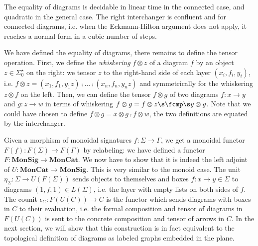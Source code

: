 \begin{theorem}
The equality of diagrams is decidable in linear time in the connected case, and quadratic in the general case.
The right interchanger is confluent and for connected diagrams, i.e. when the Eckmann-Hilton argument does not apply, it reaches a normal form in a cubic number of steps.
\end{theorem}

We have defined the equality of diagrams, there remains to define the tensor operation.
First, we define the \emph{whiskering} $f \otimes z$ of a diagram $f$ by an object $z \in \Sigma_0^\star$ on the right: we tensor $z$ to the right-hand side of each layer $(x_i, f_i, y_i)$, i.e. $f \otimes z = (x_1, f_1, y_1 z) \fcmp \dots \fcmp (x_n, f_n, y_n z)$ and symmetrically for the whiskering $z \otimes f$ on the left.
Then, we can define the tensor $f \otimes g$ of two diagrams $f : x \to y$ and $g : z \to w$ in terms of whiskering $f \otimes g = f \otimes z \s \fcmp \s y \otimes g$.
Note that we could have chosen to define $f \otimes g = x \otimes g \fcmp f \otimes w$, the two definitions are equated by the interchanger.

Given a morphism of monoidal signatures $f : \Sigma \to \Gamma$, we get a monoidal functor $F(f) : F(\Sigma) \to F(\Gamma)$ by relabeling: we have defined a functor $F : \mathbf{MonSig} \to \mathbf{MonCat}$.
We now have to show that it is indeed the left adjoint of $U : \mathbf{MonCat} \to \mathbf{MonSig}$.
This is very similar to the monoid case.
The unit $\eta_\Sigma : \Sigma \to U(F(\Sigma))$ sends objects to themselves and boxes $f : x \to y \in \Sigma$ to diagrams $(1, f, 1) \in L(\Sigma)$, i.e. the layer with empty lists on both sides of $f$.
The counit $\epsilon_C : F(U(C)) \to C$ is the functor which sends diagrams with boxes in $C$ to their evaluation, i.e. the formal composition and tensor of diagrams in $F(U(C))$ is sent to the concrete composition and tensor of arrows in $C$.
In the next section, we will show that this construction is in fact equivalent to the topological definition of diagrams as labeled graphs embedded in the plane.

